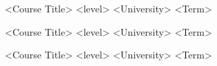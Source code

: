 \begin{cvhonors}
	\cvhonor
	{<Course Title>}
	{<level>}
	{<University>}
	{<Term>}
	
	\cvhonor
	{<Course Title>}
	{<level>}
	{<University>}
	{<Term>}
	
	\cvhonor
	{<Course Title>}
	{<level>}
	{<University>}
	{<Term>}
\end{cvhonors}